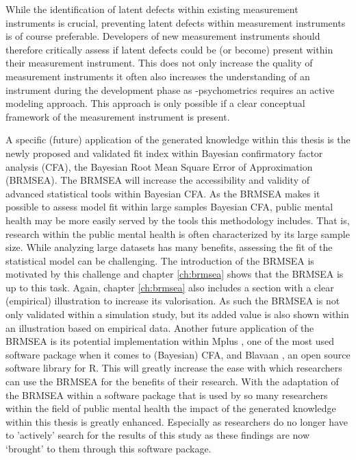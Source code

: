 While the identification of latent defects within existing measurement instruments is crucial, preventing latent defects within measurement instruments is of course preferable. Developers of new measurement instruments should therefore critically assess if latent defects could be (or become) present within their measurement instrument. This does not only increase the quality of measurement instruments it often also increases the understanding of an instrument during the development phase as \textbeta-psychometrics requires an active modeling approach. This approach is only possible if a clear conceptual framework of the measurement instrument is present.

A specific (future) application of the generated knowledge within this thesis is the newly proposed and validated fit index within Bayesian confirmatory factor analysis (CFA), the Bayesian Root Mean Square Error of Approximation (BRMSEA). The BRMSEA will increase the accessibility and validity of advanced statistical tools within Bayesian CFA. As the BRMSEA makes it possible to assess model fit within large samples Bayesian CFA, public mental health may be more easily served by the tools this methodology includes. That is, research within the public mental health is often characterized by its large sample size. While analyzing large datasets has many benefits, assessing the fit of the statistical model can be challenging. The introduction of the BRMSEA is motivated by this challenge and chapter \ref{ch:brmsea} shows that the BRMSEA is up to this task. Again, chapter \ref{ch:brmsea} also includes a section with a clear (empirical) illustration to increase its valorisation. As such the BRMSEA is not only validated within a simulation study, but its added value is also shown within an illustration based on empirical data. Another future application of the BRMSEA is its potential implementation within Mplus \parencite{Muthen_1998}, one of the most used software package when it comes to (Bayesian) CFA, and Blavaan \parencite{Merkle_2016}, an open source software library for R. This will greatly increase the ease with which researchers can use the BRMSEA for the benefits of their research. With the adaptation of the BRMSEA within a software package that is used by so many researchers within the field of public mental health the impact of the generated knowledge within this thesis is greatly enhanced. Especially as researchers do no longer have to 'actively' search for the results of this study as these findings are now `brought' to them through this software package.

